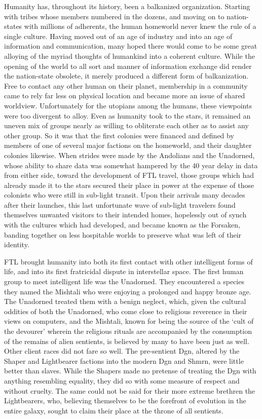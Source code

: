 Humanity has, throughout its history, been a balkanized organization. Starting with tribes whose members numbered in the dozens, and moving on to nation-states with millions of adherents, the human homeworld never knew the rule of a single culture. Having moved out of an age of industry and into an age of information and communication, many hoped there would come to be some great alloying of the myriad thoughts of humankind into a coherent culture. While the opening of the world to all sort and manner of information exchange did render the nation-state obsolete, it merely produced a different form of balkanization. Free to contact any other human on their planet, membership in a community came to rely far less on physical location and became more an issue of shared worldview. Unfortunately for the utopians among the humans, these viewpoints were too divergent to alloy. Even as humanity took to the stars, it remained an uneven mix of groups nearly as willing to obliterate each other as to assist any other group. So it was that the first colonies were financed and defined by members of one of several major factions on the homeworld, and their daughter colonies likewise. When strides were made by the Andolians and the Unadorned, whose ability to share data was somewhat hampered by the 40 year delay in data from either side, toward the development of FTL travel, those groups which had already made it to the stars secured their place in power at the expense of those colonists who were still in sub-light transit. Upon their arrivals many decades after their launches, this last unfortunate wave of sub-light travelers found themselves unwanted visitors to their intended homes, hopelessly out of synch with the cultures which had developed, and became known as the Forsaken, banding together on less hospitable worlds to preserve what was left of their identity.

FTL brought humanity into both its first contact with other intelligent forms of life, and into its first fratricidal dispute in interstellar space. The first human group to meet intelligent life was the Unadorned. They encountered a species they named the Mishtali who were enjoying a prolonged and happy bronze age. The Unadorned treated them with a benign neglect, which, given the cultural oddities of both the Unadorned, who come close to religious reverence in their views on computers, and the Mishtali, known for being the source of the ‘cult of the devourer’ wherein the religious rituals are accompanied by the consumption of the remains of alien sentients, is believed by many to have been just as well. Other client races did not fare so well. The pre-sentient Dgn, altered by the Shaper and Lightbearer factions into the modern Dgn and Shmrn, were little better than slaves. While the Shapers made no pretense of treating the Dgn with anything resembling equality, they did so with some measure of respect and without cruelty. The same could not be said for their more extreme brethren the Lightbearers, who, believing themselves to be the forefront of evolution in the entire galaxy, sought to claim their place at the throne of all sentients.

